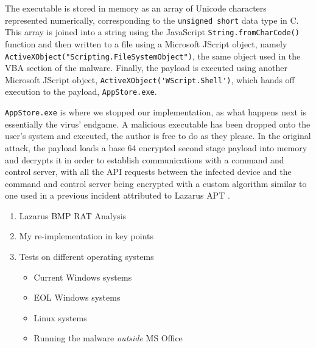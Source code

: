 The executable is stored in memory as an array of Unicode characters represented numerically, corresponding to the
\verb+unsigned short+ data type in C. This array is joined into a string using the JavaScript \verb+String.fromCharCode()+
function and then written to a file using a Microsoft JScript object, namely
\verb+ActiveXObject("Scripting.FileSystemObject")+, the same object used in the \acrshort{VBA} section of the malware.
Finally, the payload is executed using another Microsoft JScript object, \verb+ActiveXObject('WScript.Shell')+, which
hands off execution to the payload, \verb+AppStore.exe+.

\verb+AppStore.exe+ is where we stopped our implementation, as what happens next is essentially the virus' endgame. 
A malicious executable has been dropped onto the user's system and executed, the author is free to do as they please.
In the original attack, the payload loads a base 64 encrypted second stage payload into memory and decrypts it in order to
establish communications with a command and control server, with all the API requests between the infected device
and the command and control server being encrypted with a custom algorithm similar to one used in a previous incident
attributed to Lazarus \acrshort{APT} \cite{jazi-article}. 

\begin{enumerate}
  \item Lazarus BMP RAT Analysis
  \item My re-implementation in key points
  \item Tests on different operating systems
    \begin{itemize}
      \item Current Windows systems
      \item EOL Windows systems
      \item Linux systems
      \item Running the malware \emph{outside} MS Office
    \end{itemize}
\end{enumerate}


